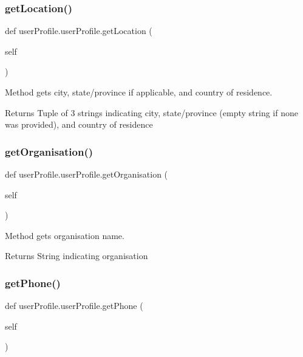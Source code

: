 \subsubsection{\texorpdfstring{get\+Location()}{getLocation()}}
{\footnotesize\ttfamily def user\+Profile.\+user\+Profile.\+get\+Location (\begin{DoxyParamCaption}\item[{}]{self }\end{DoxyParamCaption})}



Method gets city, state/province if applicable, and country of residence. 

\begin{DoxyReturn}{Returns}
Tuple of 3 strings indicating city, state/province (empty string if none was provided), and country of residence 
\end{DoxyReturn}
\mbox{\label{classuserProfile_1_1userProfile_aa146aa6eba2de13cfcff77e14409b891}} 
\subsubsection{\texorpdfstring{get\+Organisation()}{getOrganisation()}}
{\footnotesize\ttfamily def user\+Profile.\+user\+Profile.\+get\+Organisation (\begin{DoxyParamCaption}\item[{}]{self }\end{DoxyParamCaption})}



Method gets organisation name. 

\begin{DoxyReturn}{Returns}
String indicating organisation 
\end{DoxyReturn}
\mbox{\label{classuserProfile_1_1userProfile_ac6014db8a44e3e1ea44d30a2dbeb2b25}} 
\subsubsection{\texorpdfstring{get\+Phone()}{getPhone()}}
{\footnotesize\ttfamily def user\+Profile.\+user\+Profile.\+get\+Phone (\begin{DoxyParamCaption}\item[{}]{self }\end{DoxyParamCaption})}



